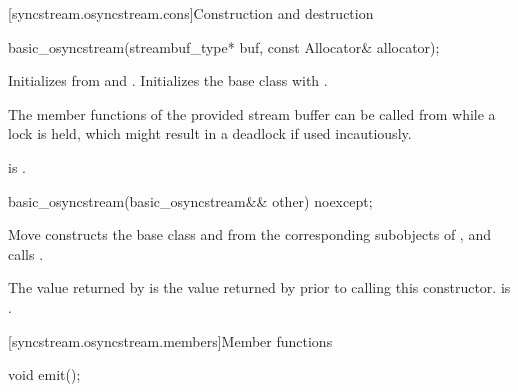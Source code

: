 [syncstream.osyncstream.cons]{Construction and destruction}

%
\begin{itemdecl}
basic_osyncstream(streambuf_type* buf, const Allocator& allocator);
\end{itemdecl}

\begin{itemdescr}
\pnum
\effects
Initializes  from  and .
Initializes the base class with .

\pnum
\begin{note}
The member functions of the provided stream buffer
can be called from  while a lock is held,
which might result in a deadlock if used incautiously.
\end{note}

\pnum
\ensures
{} is .
\end{itemdescr}

%
\begin{itemdecl}
basic_osyncstream(basic_osyncstream&& other) noexcept;
\end{itemdecl}

\begin{itemdescr}
\pnum
\effects
Move constructs the base class
and  from the corresponding subobjects of ,
and calls .

\pnum
\ensures
The value returned by 
is the value returned by 
prior to calling this constructor.
 is .
\end{itemdescr}

[syncstream.osyncstream.members]{Member functions}

%
\begin{itemdecl}
void emit();
\end{itemdecl}


